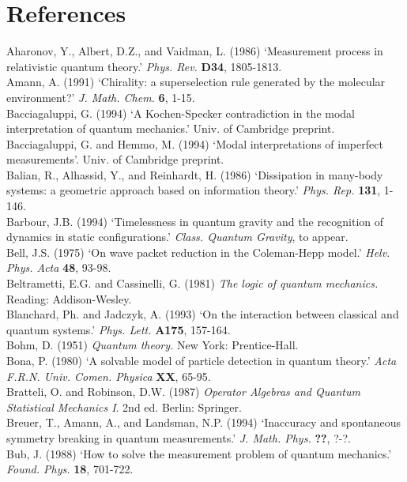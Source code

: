 \documentclass[12pt,titlepage]{article}
\begin{document}
 \section*{References}
  Aharonov, Y.,  Albert, D.Z., and  Vaidman, L. (1986)
`Measurement process in relativistic quantum theory.' {\em Phys. Rev.} {\bf
D34}, 1805-1813.\\
 Amann, A. (1991) `Chirality: a superselection rule generated by the molecular
environment?'
{\em  J.
Math. Chem.} {\bf 6},   1-15.\\
Bacciagaluppi, G. (1994) `A Kochen-Specker contradiction in the modal
interpretation of quantum
mechanics.' Univ. of Cambridge preprint.\\
Bacciagaluppi, G. and Hemmo, M. (1994) `Modal interpretations of imperfect
measurements'.
 Univ. of Cambridge preprint.\\
 Balian, R.,  Alhassid, Y., and  Reinhardt, H. (1986) `Dissipation in many-body
systems: a geometric approach based on information theory.' {\em Phys. Rep.}
{\bf 131},  1-146.\\
Barbour, J.B. (1994) `Timelessness in quantum gravity and the recognition of
dynamics in static
configurations.' {\em Class. Quantum Gravity}, to appear.\\
Bell, J.S. (1975) `On wave packet reduction in the Coleman-Hepp model.'   {\em
Helv. Phys. Acta} {\bf
48},
 93-98. \\
  Beltrametti, E.G. and  Cassinelli, G. (1981) {\em The logic of quantum
mechanics.}
 Reading: Addison-Wesley.\\
Blanchard, Ph. and Jadczyk, A. (1993) `On the interaction between classical and
quantum systems.'
{\em Phys. Lett.} {\bf A175}, 157-164.\\
  Bohm, D. (1951) {\em Quantum theory.} New York: Prentice-Hall.\\
  Bona, P. (1980)  `A solvable model of
particle detection in quantum theory.' {\em Acta F.R.N. Univ. Comen. Physica}
{\bf XX}, 65-95.\\
Bratteli,  O. and Robinson, D.W. (1987) {\em Operator Algebras and
Quantum Statistical Mechanics I}. 2nd ed. Berlin: Springer.\\
Breuer, T., Amann, A., and Landsman, N.P. (1994) `Inaccuracy and spontaneous
symmetry breaking in
quantum measurements.' {\em J. Math. Phys.} {\bf ??}, ?-?.\\
 Bub,  J. (1988)  `How to solve the measurement problem of quantum mechanics.'
{\em Found. Phys.}
{\bf  18},  701-722.\\
\end{document}

